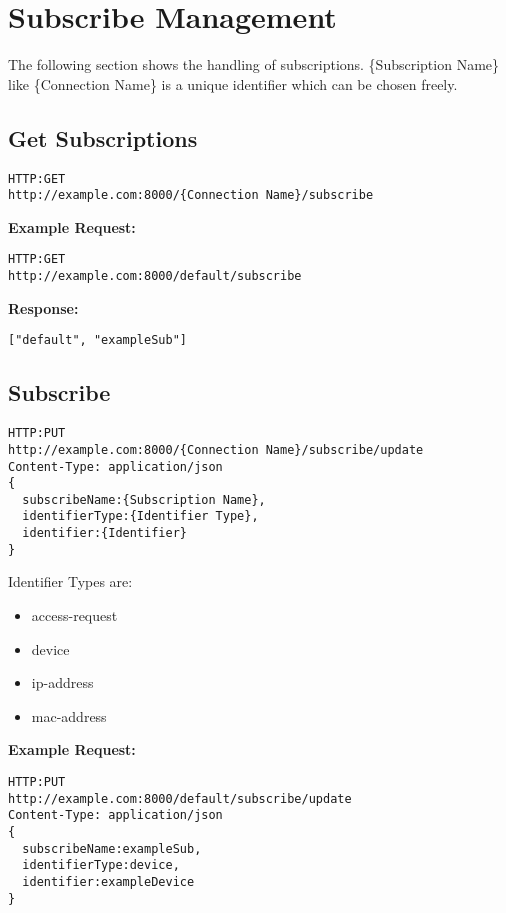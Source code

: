 \section{Subscribe Management}
The following section shows the handling of subscriptions. \{Subscription Name\} like \{Connection Name\} is a unique identifier which can be chosen freely.
\subsection{Get Subscriptions}
\begin{lstlisting}
HTTP:GET
http://example.com:8000/{Connection Name}/subscribe
\end{lstlisting}

\begin{minipage}{\linewidth}
\textbf{Example Request:}
\begin{lstlisting}
HTTP:GET
http://example.com:8000/default/subscribe
\end{lstlisting}
\end{minipage}

\begin{minipage}{\linewidth}
\textbf{Response:}
\begin{lstlisting}
["default", "exampleSub"]
\end{lstlisting}
\end{minipage}

\subsection{Subscribe}
\begin{lstlisting}
HTTP:PUT
http://example.com:8000/{Connection Name}/subscribe/update
Content-Type: application/json
{
  subscribeName:{Subscription Name},
  identifierType:{Identifier Type},
  identifier:{Identifier}
}
\end{lstlisting}
Identifier Types are:
\begin{itemize}
\item access-request
\item device
\item ip-address
\item mac-address
\end{itemize}

\begin{minipage}{\linewidth}
\textbf{Example Request:}
\begin{lstlisting}
HTTP:PUT
http://example.com:8000/default/subscribe/update
Content-Type: application/json
{
  subscribeName:exampleSub,
  identifierType:device,
  identifier:exampleDevice
}
\end{lstlisting}
\end{minipage}

